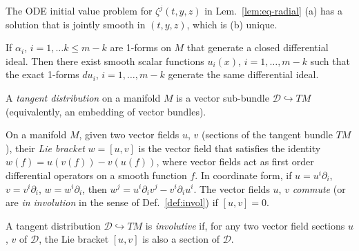 \begin{lemma} \label{lem:eq-radial-exists}
The ODE initial value problem for $\zeta^j(t,y,z)$ in Lem.~\ref{lem:eq-radial}
(a) has a solution that is jointly smooth in $(t,y,z)$, which is (b) unique.
\end{lemma}

\begin{definition} \label{def:forms}
\notready
\end{definition}

\begin{definition} \label{def:diff-ideal}
\notready
\end{definition}

\begin{theorem} \label{thm:frob-forms}
If $\alpha_i$, $i=1,\ldots k\le m-k$ are 1-forms on $M$ that generate a closed
differential ideal. Then there exist smooth scalar functions $u_i(x)$,
$i=1,\ldots,m-k$ such that the exact 1-forms $du_i$, $i=1,\ldots,m-k$ generate
the same differential ideal.
\end{theorem}

\begin{definition} \label{def:vec-dist}
A \emph{tangent distribution} on a manifold $M$ is a vector sub-bundle
$\mathcal{D}\hookrightarrow TM$ (equivalently, an embedding of vector bundles).
\end{definition}

\begin{definition} \label{def:lie}
On a manifold $M$, given two vector fields $u$, $v$ (sections of the tangent
bundle $TM$), their \emph{Lie bracket} $w = [u,v]$ is the vector field that
satisfies the identity $w(f) = u(v(f)) - v(u(f))$, where vector fields act as
first order differential operators on a smooth function $f$. In coordinate form,
if $u = u^i\partial_i$, $v = v^i\partial_i$, $w = w^i\partial_i$, then $w^j =
u^i \partial_i v^j - v^i \partial_i u^i$. The vector fields $u$, $v$
\emph{commute} (or are \emph{in involution} in the sense of
Def.~\ref{def:invol}) if $[u,v] = 0$.
\end{definition}

\begin{definition} \label{def:inv-distr}
A tangent distribution $\mathcal{D} \hookrightarrow TM$ is \emph{involutive} if,
for any two vector field sections $u$, $v$ of $\mathcal{D}$, the Lie bracket
$[u,v]$ is also a section of $\mathcal{D}$.
\end{definition}

